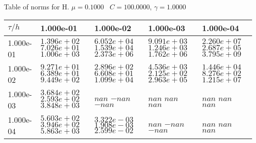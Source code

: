 \begin{center}
Table of norms for H. $\mu = 0.1000$ \, $C = 100.0000$, $\gamma = 1.0000$
  
\begin{tabular}{|p{1in}|p{1in}|p{1in}|p{1in}|p{1in}|} \hline
$\tau / h$ &1.000e-01 &1.000e-02 &1.000e-03 &1.000e-04 \\ \hline 
1.000e-01 & $1.396e+02$  $7.026e+01$  $1.006e+03$  & $6.052e+04$  $1.539e+04$  $2.373e+06$  & $9.091e+03$  $1.246e+03$  $1.762e+06$  & $2.260e+07$  $2.687e+05$  $3.795e+09$  \\ \hline 
1.000e-02 & $9.271e+01$  $6.389e+01$  $9.449e+02$  & $2.896e+02$  $6.608e+01$  $1.099e+04$  & $4.536e+03$  $2.125e+02$  $2.963e+05$  & $1.446e+04$  $8.276e+02$  $1.215e+07$  \\ \hline 
1.000e-03 & $3.684e+02$  $2.593e+02$  $3.848e+03$  & $nan$  $-nan$  $-nan$  & $nan$  $nan$  $nan$  & $nan$  $nan$  $nan$  \\ \hline 
1.000e-04 & $5.603e+02$  $3.946e+02$  $5.863e+03$  & $3.322e-03$  $1.908e-03$  $2.599e-02$  & $nan$  $-nan$  $-nan$  & $nan$  $nan$  $nan$  \\ \hline 

\end{tabular}\\[20pt]
\end{center}

